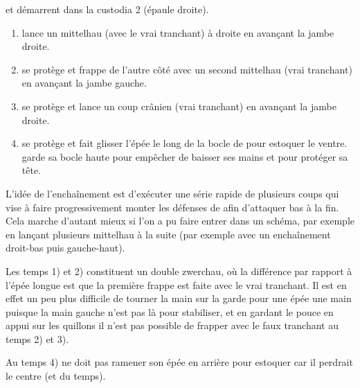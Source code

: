 \begin{technique}[Liegniczer 4]
\A et \D démarrent dans la custodia 2 (épaule droite).

\begin{enumerate}
	\item \A lance un mittelhau (avec le vrai tranchant) à droite en avançant la jambe droite.
	
	\item \D se protège et \A frappe de l'autre côté avec un second mittelhau (vrai tranchant) en avançant la jambe gauche.
	
	\item \D se protège et \A lance un coup crânien (vrai tranchant) en avançant la jambe droite.
	
	\item \D se protège et \A fait glisser l'épée le long de la bocle de \D pour estoquer le ventre.
		\A garde sa bocle haute pour empêcher \D de baisser ses mains et pour protéger sa tête.
\end{enumerate}

L'idée de l'enchaînement est d'exécuter une série rapide de plusieurs coups qui vise à faire progressivement monter les défenses de \D afin d'attaquer bas à la fin.
Cela marche d'autant mieux si l'on a pu faire entrer \D dans un schéma, par exemple en lançant plusieurs mittelhau à la suite (par exemple avec un enchaînement droit-bas puis gauche-haut).

Les temps 1) et 2) constituent un double zwerchau, où la différence par rapport à l'épée longue est que la première frappe est faite avec le vrai tranchant.
Il est en effet un peu plus difficile de tourner la main sur la garde pour une épée une main puisque la main gauche n'est pas là pour stabiliser, et en gardant le pouce en appui sur les quillons il n'est pas possible de frapper avec le faux tranchant au temps 2) et 3).

Au temps 4) \A ne doit pas ramener son épée en arrière pour estoquer car il perdrait le centre (et du temps).

\end{technique}


